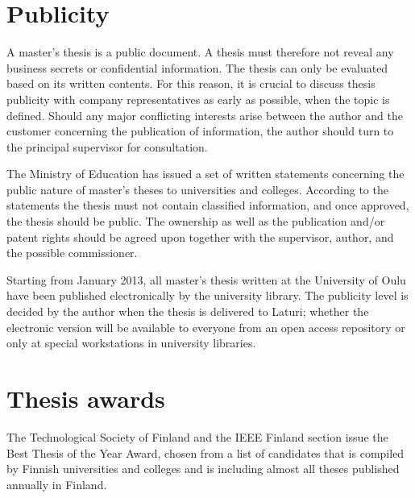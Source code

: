 \section{Publicity}
\label{sec:publicity}

A master’s thesis is a public document. A thesis must therefore not reveal any business secrets or confidential information. The thesis can only be evaluated based on its written contents. For this reason, it is crucial to discuss thesis publicity with company representatives as early as possible, when the topic is defined. Should any major conflicting interests arise between the author and the customer concerning the publication of information, the author should turn to the principal supervisor for consultation.

The Ministry of Education has issued a set of written statements concerning the public nature of master’s theses to universities and colleges. According to the statements the thesis must not contain classified information, and once approved, the thesis should be public. The ownership as well as the publication and/or patent rights should be agreed upon together with the supervisor, author, and the possible commissioner.

Starting from January 2013, all master’s thesis written at the University of Oulu have been published electronically by the university library. The publicity level is decided by the author when the thesis is delivered to Laturi; whether the electronic version will be available to everyone from an open access repository or only at special workstations in university libraries.

\section{Thesis awards}

The Technological Society of Finland and the IEEE Finland section issue the Best Thesis of the Year Award, chosen from a list of candidates that is compiled by Finnish universities and colleges and is including almost all theses published annually in Finland.
